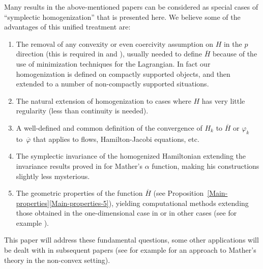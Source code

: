 \documentclass[JEP,XML,SOM,NoFloatCountersInSection,Unicode,published]{cedram}
\numberwithin{equation}{section}
\theoremstyle{plain}
\theoremstyle{definition}
\theoremstyle{remark}
\begin{document}
Many results in the above-mentioned papers can be considered as special cases of ``symplectic homogenization'' that is presented here. We believe some
of the advantages of this unified treatment are:

\begin{enumerate}
\item The removal of any convexity or even coercivity assumption on $H$ in the $p$
direction (this is required in \cite{L-P-V} and \cite{Evans, Fathi1, Fathi3}), usually needed to define $\overline H$ because of the use of minimization
techniques for the Lagrangian. In fact our homogenization is defined on compactly supported objects, and then extended to a number of non-compactly supported situations.
\item The natural extension of homogenization to cases where $H$ has very
little regularity (less than continuity is needed).
\item A well-defined and common definition of the convergence of $H_{k}$
to $\overline{H}$ or $\varphi_{k}$ to~$\overline\varphi$ that applies to flows, Hamilton-Jacobi equations, etc.
\item The symplectic invariance of the homogenized Hamiltonian extending the invariance results proved in \cite{Bernard} for Mather's $\alpha$ function, making his constructions slightly less mysterious.
\item The geometric properties of the function $\overline H$ (see Proposition~\ref{Main-properties}\eqref{Main-properties-5}),
yielding computational methods extending those obtained in the one-dimensional case in \cite{L-P-V} or in other cases (see for example \cite{Concordel}).
\end{enumerate}

This paper will address these fundamental questions,
some other applications will be dealt with in subsequent papers (see for example \cite{NCMT} for an approach to Mather's theory in the non-convex setting).
\end{document}
